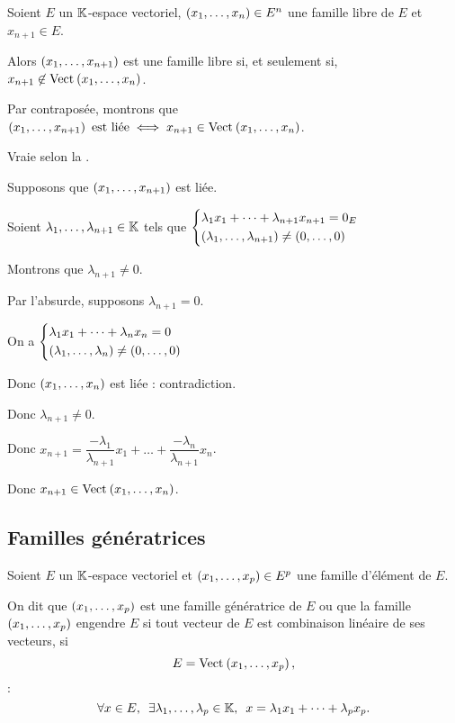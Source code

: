 \begin{prop}
Soient \(E\) un \(\mathbb{K}\)-espace vectoriel, \(\left(x_1,\dots,x_n\right)\in E^n\) une famille libre de \(E\) et \(x_{n+1}\in E\).

Alors \(\left(x_1,\dots,x_{n+1}\right)\) est une famille libre si, et seulement si, \(x_{n+1}\not\in\Vect{x_1,\dots,x_n}\).
\end{prop}

\begin{dem}
Par contraposée, montrons que \(\paren{x_1,\dots,x_{n+1}}\text{ est liée}\ssi x_{n+1}\in\Vect{x_1,\dots,x_n}\).

\imprec Vraie selon la .

\impdir

Supposons que \(\left(x_1,\dots,x_{n+1}\right)\) est liée.

Soient \(\lambda_1,\dots,\lambda_{n+1}\in\mathbb{K}\) tels que \(\begin{dcases}
\lambda_1x_1+\dots+\lambda_{n+1}x_{n+1}=0_E \\
\left(\lambda_1,\dots,\lambda_{n+1}\right)\not=\left(0,\dots,0\right)
\end{dcases}\)

Montrons que \(\lambda_{n+1}\not=0\).

Par l'absurde, supposons \(\lambda_{n+1}=0\).

On a \(\begin{dcases}
\lambda_1x_1+\dots+\lambda_nx_n=0 \\
\left(\lambda_1,\dots,\lambda_n\right)\not=\left(0,\dots,0\right)
\end{dcases}\)

Donc \(\left(x_1,\dots,x_n\right)\) est liée : contradiction.

Donc \(\lambda_{n+1}\not=0\).

Donc \(x_{n+1}=\dfrac{-\lambda_1}{\lambda_{n+1}}x_1+\dots+\dfrac{-\lambda_n}{\lambda_{n+1}}x_n\).

Donc \(x_{n+1}\in\Vect{x_1,\dots,x_n}\).
\end{dem}

\subsection{Familles génératrices}

\begin{defi}
Soient \(E\) un \(\mathbb{K}\)-espace vectoriel et \(\left(x_1,\dots,x_p\right)\in E^p\) une famille d'élément de \(E\).

On dit que \(\left(x_1,\dots,x_p\right)\) est une famille génératrice de \(E\) ou que la famille \(\left(x_1,\dots,x_p\right)\) engendre \(E\) si tout vecteur de \(E\) est combinaison linéaire de ses vecteurs, \cad si \[E=\Vect{x_1,\dots,x_p},\] \cad : \[\quantifs{\forall x\in E;\exists\lambda_1,\dots,\lambda_p\in\K}x=\lambda_1x_1+\dots+\lambda_px_p.\]
\end{defi}

